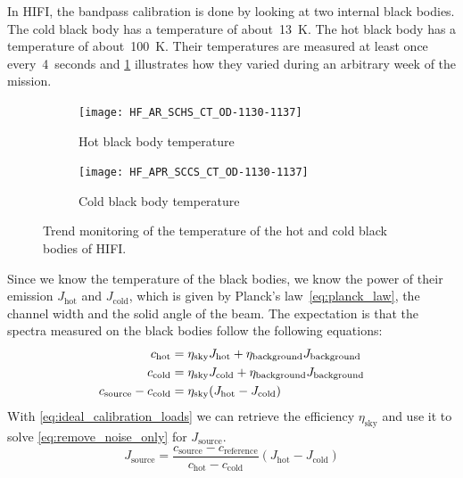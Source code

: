 In HIFI, the bandpass calibration is done by looking at two internal black bodies.
The cold black body has a temperature of about~\SI{13}{\kelvin}.
The hot black body has a temperature of about~\SI{100}{\kelvin}.
Their temperatures are measured at least once every~\SI{4}{seconds}
and \cref{fig:bb_trend} illustrates how they varied during an arbitrary week of the mission.
\begin{figure}[hbtp]
    \centering
    \begin{subfigure}[b]{.5\textwidth}
        \texttt{[image: HF\_AR\_SCHS\_CT\_OD-1130-1137]}
        \caption{Hot black body temperature}
    \end{subfigure}%
    \begin{subfigure}[b]{.5\textwidth}
        \texttt{[image: HF\_APR\_SCCS\_CT\_OD-1130-1137]}
        \caption{Cold black body temperature}
    \end{subfigure}
    \caption{Trend monitoring of the temperature of the hot and cold black bodies of HIFI.}
    \label{fig:bb_trend}
\end{figure}
Since we know the temperature of the black bodies, we know the power of their emission $J_\text{hot}$ and $J_\text{cold}$, which is given by Planck's law~\eqref{eq:planck_law}, the channel width and the solid angle of the beam.
The expectation is that the spectra measured on the black bodies follow the following equations:
\begin{align}
    c_\text{hot}  &= \eta_\text{sky} J_\text{hot} + \eta_\text{background} J_\text{background} \notag
    \\
    c_\text{cold} &= \eta_\text{sky} J_\text{cold} + \eta_\text{background} J_\text{background} \notag
    \\
    c_\text{source} - c_\text{cold} &= \eta_\text{sky} (J_\text{hot} - J_\text{cold}) \label{eq:ideal_calibration_loads}
\end{align}
With \cref{eq:ideal_calibration_loads} we can retrieve the efficiency $\eta_\text{sky}$ and use it to solve \cref{eq:remove_noise_only} for $J_\text{source}$.
\begin{equation}
    J_\text{source} =
    \frac{
        c_\text{source} - c_\text{reference}
    }{
        c_\text{hot} - c_\text{cold}
    }
    (J_\text{hot} - J_\text{cold})
    \label{eq:ideal_calibration_solution}
\end{equation}

